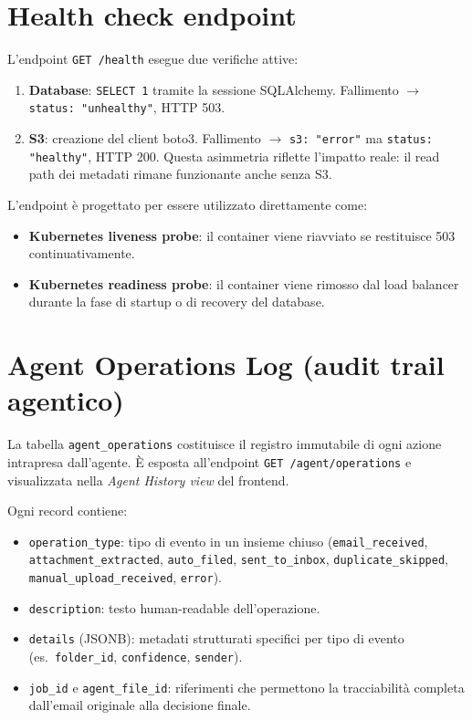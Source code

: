 \section{Health check endpoint}
\label{sec:health}

L'endpoint \texttt{GET /health} esegue due verifiche attive:

\begin{enumerate}[leftmargin=*]
    \item \textbf{Database}: \texttt{SELECT 1} tramite la sessione SQLAlchemy.
          Fallimento $\rightarrow$ \texttt{status: "unhealthy"}, HTTP 503.
    \item \textbf{S3}: creazione del client boto3.
          Fallimento $\rightarrow$ \texttt{s3: "error"} ma \texttt{status: "healthy"},
          HTTP 200. Questa asimmetria riflette l'impatto reale: il read path dei
          metadati rimane funzionante anche senza S3.
\end{enumerate}

L'endpoint \`e progettato per essere utilizzato direttamente come:
\begin{itemize}[leftmargin=*]
    \item \textbf{Kubernetes liveness probe}: il container viene riavviato se restituisce
          503 continuativamente.
    \item \textbf{Kubernetes readiness probe}: il container viene rimosso dal load
          balancer durante la fase di startup o di recovery del database.
\end{itemize}

\section{Agent Operations Log (audit trail agentico)}
\label{sec:audit_log}

La tabella \texttt{agent\_operations} costituisce il registro immutabile di ogni azione
intrapresa dall'agente. \`E esposta all'endpoint \texttt{GET /agent/operations} e
visualizzata nella \emph{Agent History view} del frontend.

Ogni record contiene:
\begin{itemize}[leftmargin=*]
    \item \texttt{operation\_type}: tipo di evento in un insieme chiuso
          (\texttt{email\_received}, \texttt{attachment\_extracted}, \texttt{auto\_filed},
          \texttt{sent\_to\_inbox}, \texttt{duplicate\_skipped},
          \texttt{manual\_upload\_received}, \texttt{error}).
    \item \texttt{description}: testo human-readable dell'operazione.
    \item \texttt{details} (JSONB): metadati strutturati specifici per tipo di evento
          (es.\ \texttt{folder\_id}, \texttt{confidence}, \texttt{sender}).
    \item \texttt{job\_id} e \texttt{agent\_file\_id}: riferimenti che permettono
          la tracciabilit\`a completa dall'email originale alla decisione finale.
\end{itemize}

